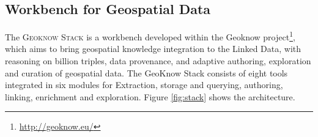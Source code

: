 \subsection{Workbench for Geospatial Data}
\label{sec:geoknow}
The \textsc{Geoknow Stack} is a workbench developed within the Geoknow project\footnote{\url{http://geoknow.eu/}}, which aims to bring geospatial knowledge integration to the Linked Data, with reasoning on billion triples, data provenance, and adaptive authoring, exploration and curation of geospatial data. The GeoKnow Stack consists of eight tools integrated in six modules for Extraction, storage and querying, authoring, linking, enrichment and exploration. Figure \ref{fig:stack} shows the architecture.

\begin{figure}[htb!p]
\vspace{-6cm}
\end{figure}

